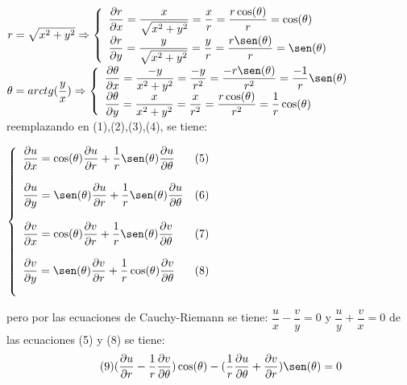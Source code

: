 \documentclass[10pt,a4paper]{book}
\begin{document}
$r = \sqrt{x^2 + y^2} \Rightarrow \displaystyle \left\{ 
  \begin{array}{lcr}
   \dfrac{\partial r}{\partial x} = \dfrac{x}{\sqrt{x^2+y^2}} = \dfrac{x}{r} = \dfrac{r \cos(\theta)}{r}=\cos(\theta) \\
   \dfrac{\partial r}{\partial y} = \dfrac{y}{\sqrt{x^2+y^2}} = \dfrac{y}{r} = \dfrac{r \sen(\theta)}{r}=\sen(\theta) \\
   \end{array}   
\right.$ 
\\
$ \theta = arctg(\dfrac{y}{x}) \Rightarrow \displaystyle \left\{ 
  \begin{array}{lcr}
   \dfrac{\partial \theta}{\partial x} = \dfrac{-y}{x^2+y^2} = \dfrac{-y}{r^2} = \dfrac{-r \sen(\theta)}{r^2}=\dfrac{-1}{r} \sen(\theta) \\
   \dfrac{\partial \theta}{\partial y} = \dfrac{x}{x^2+y^2} = \dfrac{x}{r^2} = \dfrac{r \cos(\theta)}{r^2}=\dfrac{1}{r} \cos(\theta)
  \end{array}
\right.$ 
\\reemplazando en (1),(2),(3),(4), se tiene:
 \begin{center}
  $\displaystyle \left\{ 
  \begin{array}{lcr}
   \dfrac{\partial u}{\partial x} = \cos(\theta) \dfrac{\partial u}{\partial r} + \dfrac{1}{r} \sen(\theta) \dfrac{\partial u}{\partial \theta} & (5) \\ \\
   \dfrac{\partial u}{\partial y} = \sen(\theta)\dfrac{\partial u}{\partial r}  + \dfrac{1}{r} \sen(\theta) \dfrac{\partial u}{\partial \theta} & (6) \\ \\
   \dfrac{\partial v}{\partial x} = \cos(\theta) \dfrac{\partial v}{\partial r} + \dfrac{1}{r} \sen(\theta) \dfrac{\partial v}{\partial \theta} & (7) \\ \\
   \dfrac{\partial v}{\partial y} = \sen(\theta) \dfrac{\partial v}{\partial r} + \dfrac{1}{r} \cos(\theta) \dfrac{\partial v}{\partial \theta} & (8) \\ \\
   \end{array}   
\right.$
 \end{center}   
 pero por las ecuaciones de Cauchy-Riemann se tiene:
 $\displaystyle \dfrac{u}{x} - \dfrac{v}{y} = 0$ y $\displaystyle \dfrac{u}{y} + \dfrac{v}{x} = 0$  
 de las ecuaciones (5) y (8) se tiene:
 \begin{equation}
  \tag{9}
   (\dfrac{\partial u}{\partial r} - \dfrac{1}{r} \dfrac{\partial v}{\partial \theta}) \cos(\theta) - (\dfrac{1}{r} \dfrac{\partial u}{\partial \theta} +  \dfrac{\partial v}{\partial r}) \sen(\theta)=0 
 \end{equation}
\end{document}

